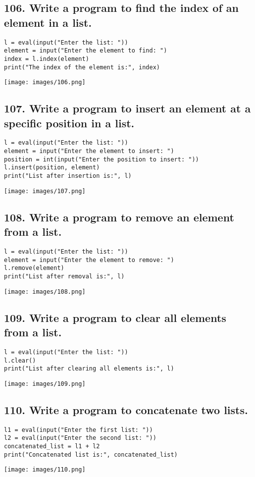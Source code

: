\documentclass[12pt]{article}
\begin{document}
\subsection*{106. Write a program to find the index of an element in a list.}
\begin{verbatim}
l = eval(input("Enter the list: "))
element = input("Enter the element to find: ")
index = l.index(element)
print("The index of the element is:", index)
\end{verbatim}
\texttt{[image: images/106.png]}

\subsection*{107. Write a program to insert an element at a specific position in a list.}
\begin{verbatim}
l = eval(input("Enter the list: "))
element = input("Enter the element to insert: ")
position = int(input("Enter the position to insert: "))
l.insert(position, element)
print("List after insertion is:", l)
\end{verbatim}
\texttt{[image: images/107.png]}

\subsection*{108. Write a program to remove an element from a list.}
\begin{verbatim}
l = eval(input("Enter the list: "))
element = input("Enter the element to remove: ")
l.remove(element)
print("List after removal is:", l)
\end{verbatim}
\texttt{[image: images/108.png]}

\subsection*{109. Write a program to clear all elements from a list.}
\begin{verbatim}
l = eval(input("Enter the list: "))
l.clear()
print("List after clearing all elements is:", l)
\end{verbatim}
\texttt{[image: images/109.png]}

\subsection*{110. Write a program to concatenate two lists.}
\begin{verbatim}
l1 = eval(input("Enter the first list: "))
l2 = eval(input("Enter the second list: "))
concatenated_list = l1 + l2
print("Concatenated list is:", concatenated_list)
\end{verbatim}
\texttt{[image: images/110.png]}
\end{document}
